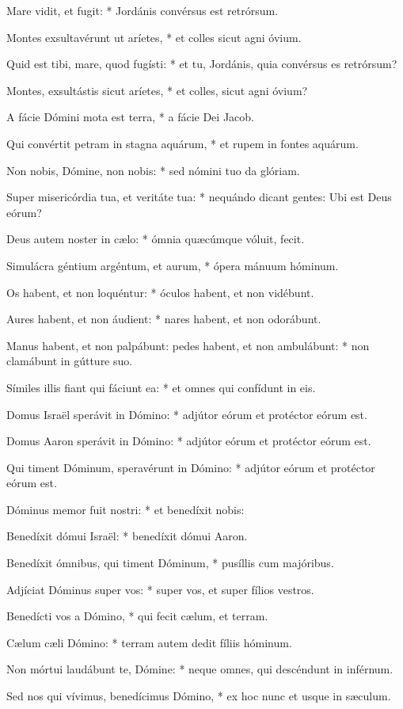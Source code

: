 Mare vidit, et fugit: * Jordánis convérsus est retrórsum.

Montes exsultavérunt ut aríetes, * et colles sicut agni óvium.

Quid est tibi, mare, quod fugísti: * et tu, Jordánis, quia convérsus es retrórsum?

Montes, exsultástis sicut aríetes, * et colles, sicut agni óvium?

A fácie Dómini mota est terra, * a fácie Dei Jacob.

Qui convértit petram in stagna aquárum, * et rupem in fontes aquárum.

Non nobis, Dómine, non nobis: * sed nómini tuo da glóriam.

Super misericórdia tua, et veritáte tua: * nequándo dicant gentes: Ubi est Deus eórum?

Deus autem noster in cælo: * ómnia quæcúmque vóluit, fecit.

Simulácra géntium argéntum, et aurum, * ópera mánuum hóminum.

Os habent, et non loquéntur: * óculos habent, et non vidébunt.

Aures habent, et non áudient: * nares habent, et non odorábunt.

Manus habent, et non palpábunt: pedes habent, et non ambulábunt: * non clamábunt in gútture suo.

Símiles illis fiant qui fáciunt ea: * et omnes qui confídunt in eis.

Domus Israël sperávit in Dómino: * adjútor eórum et protéctor eórum est.

Domus Aaron sperávit in Dómino: * adjútor eórum et protéctor eórum est.

Qui timent Dóminum, speravérunt in Dómino: * adjútor eórum et protéctor eórum est.

Dóminus memor fuit nostri: * et benedíxit nobis:

Benedíxit dómui Israël: * benedíxit dómui Aaron.

Benedíxit ómnibus, qui timent Dóminum, * pusíllis cum majóribus.

Adjíciat Dóminus super vos: * super vos, et super fílios vestros.

Benedícti vos a Dómino, * qui fecit cælum, et terram.

Cælum cæli Dómino: * terram autem dedit fíliis hóminum.

Non mórtui laudábunt te, Dómine: * neque omnes, qui descéndunt in inférnum.

Sed nos qui vívimus, benedícimus Dómino, * ex hoc nunc et usque in sæculum.

